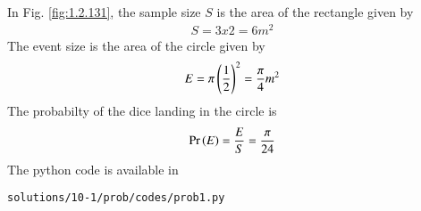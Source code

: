In Fig. \ref{fig:1.2.131}, the sample size $S$ is the area of the rectangle given by 
\begin{align}
S=3x2=6 m^2
\end{align}
The event size is the area of the circle given by 
\begin{align}
E = \pi\left(\frac{1}{2}\right)^2=\frac{\pi}{4} m^2 
\end{align}
The probabilty of the dice landing in the circle is
\begin{align}
\Pr\left(E\right) = \frac{E}{S} = \frac{\pi}{24}
\label{eq:1.2.131_prob}
\end{align}
%
The python code is available in 
\begin{lstlisting}
solutions/10-1/prob/codes/prob1.py
\end{lstlisting}

